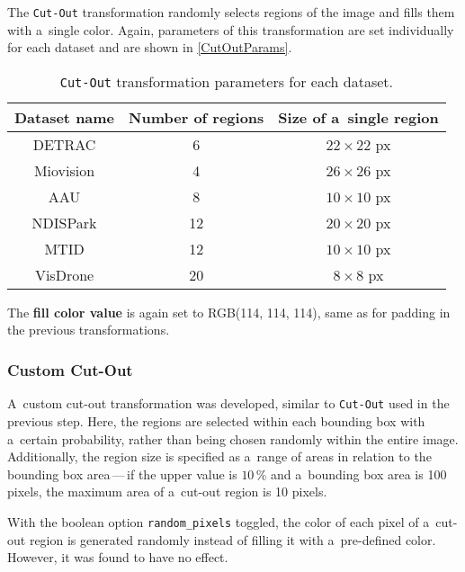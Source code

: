 The \texttt{Cut-Out} transformation randomly selects regions of the image and
fills them with a~single color. Again, parameters of this transformation are set
individually for each dataset and are shown in \autoref{CutOutParams}.

\begin{table}[h]
    \centering
    \begin{threeparttable}
        \begin{tabular}{|c|c|c|}
            \hline
            Dataset name & Number of regions & Size of a~single region \\
            \hline
            DETRAC       &  6 & $22 \times 22$ px \\
            Miovision    &  4 & $26 \times 26$ px \\
            AAU          &  8 & $10 \times 10$ px \\
            NDISPark     & 12 & $20 \times 20$ px \\
            MTID         & 12 & $10 \times 10$ px \\
            VisDrone     & 20 & $8 \times 8$ px \\
            \hline
        \end{tabular}
        \caption{\texttt{Cut-Out} transformation parameters for each dataset.}
        \label{CutOutParams}
    \end{threeparttable}
\end{table}

The \textbf{fill color value} is again set to RGB(114, 114, 114), same as for
padding in the previous transformations.

\subsubsection*{Custom Cut-Out}

A~custom cut-out transformation was developed, similar to \texttt{Cut-Out} used
in the previous step. Here, the regions are selected within each bounding box
with a~certain probability, rather than being chosen randomly within the entire image.
Additionally, the region size is specified as a~range of areas in relation to the
bounding box area\,---\,if the upper value is $10\,\%$ and a~bounding box area is 100
pixels, the maximum area of a~cut-out region is 10 pixels.

With the boolean option \texttt{random\_pixels} toggled, the color of each pixel
of a~cut-out region is generated randomly instead of filling it with
a~pre-defined color. However, it was found to have no effect.

